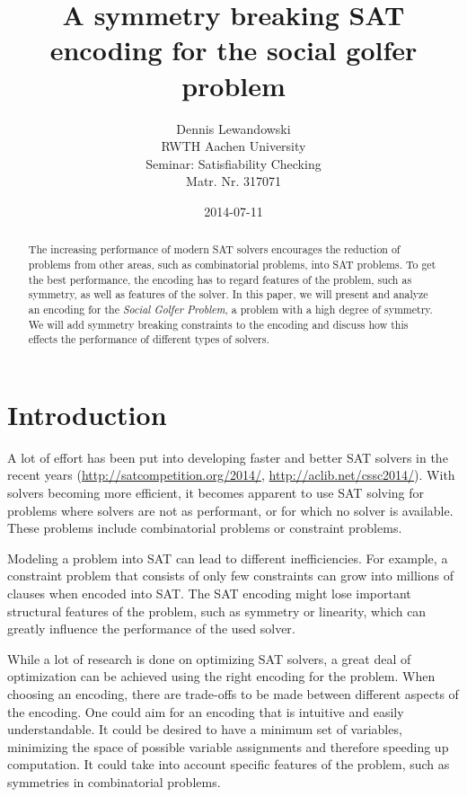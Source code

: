 \documentclass[a4paper]{scrartcl}
\title{A symmetry breaking SAT encoding for the social golfer problem}
\author{Dennis Lewandowski \\
    RWTH Aachen University \\
    Seminar: Satisfiability Checking \\
    Matr. Nr. 317071
    }
\date{2014-07-11}
\begin{document}
\maketitle

\begin{abstract}

The increasing performance of modern SAT solvers encourages the reduction of problems from other areas, such as combinatorial problems, into SAT problems. To get the best performance, the encoding has to regard features of the problem, such as symmetry, as well as features of the solver. In this paper, we will present and analyze an encoding for the \emph{Social Golfer Problem}, a problem with a high degree of symmetry. We will add symmetry breaking constraints to the encoding and discuss how this effects the performance of different types of solvers. 

\end{abstract}

\section{Introduction}

A lot of effort has been put into developing faster and better SAT solvers in the recent years (\url{http://satcompetition.org/2014/}, \url{http://aclib.net/cssc2014/}). With solvers becoming more efficient, it becomes apparent to use SAT solving for problems where solvers are not as performant, or for which no solver is available. These problems include combinatorial problems or constraint problems.

Modeling a problem into SAT can lead to different inefficiencies. For example, a constraint problem that consists of only few constraints can grow into millions of clauses when encoded into SAT. The SAT encoding might lose important structural features of the problem, such as symmetry or linearity, which can greatly influence the performance of the used solver\cite{ramani}.

While a lot of research is done on optimizing SAT solvers, a great deal of optimization can be achieved using the right encoding for the problem. When choosing an encoding, there are trade-offs to be made between different aspects of the encoding. One could aim for an encoding that is intuitive and easily understandable. It could be desired to have a minimum set of variables, minimizing the space of possible variable assignments and therefore speeding up computation. It could take into account specific features of the problem, such as symmetries in combinatorial problems.
\end{document}

